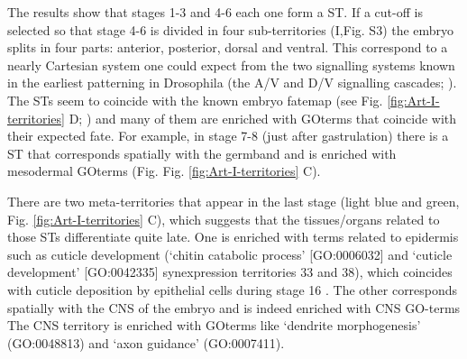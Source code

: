 The results show that stages 1-3 and 4-6 each one form a ST. If a cut-off is selected so that stage 4-6 is divided in four sub-territories (I,Fig. S3) the embryo splits in four parts: anterior, posterior, dorsal and ventral.
This correspond to a nearly Cartesian system one could expect from the two signalling systems known in the earliest patterning in Drosophila (the A/V and D/V signalling cascades; \citep{Gilbert2014}).
%
The STs seem to coincide with the known embryo fatemap (see Fig. \ref{fig:Art-I-territories} D; \citealp{Hartenstein1993}) and many of them are enriched with GOterms that coincide with their expected fate.
For example, in stage 7-8 (just after gastrulation) there is a ST that corresponds spatially with the germband and is enriched with mesodermal GOterms (Fig. Fig. \ref{fig:Art-I-territories} C).

There are two meta-territories that appear in the last stage (light blue and green, Fig. \ref{fig:Art-I-territories} C), which suggests that the tissues/organs related to those STs differentiate quite late.
%
One is enriched with terms related to epidermis such as cuticle development (`chitin catabolic process' [GO:0006032] and `cuticle development' [GO:0042335] synexpression territories 33 and 38), which coincides with cuticle deposition by epithelial cells during stage 16 \citep{Ostrowski2002}.
%
The other corresponds spatially with the CNS of the embryo and is indeed enriched with CNS GO-terms
The CNS territory is enriched with GOterms like `dendrite morphogenesis' (GO:0048813) and `axon guidance' (GO:0007411). 

